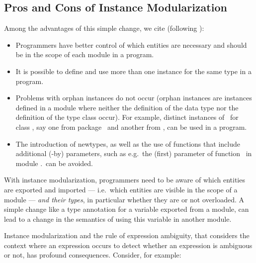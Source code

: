 \subsection{Pros and Cons of Instance Modularization}

Among the advantages of this simple change, we cite (following
\cite{Controlling-scope-instances}):

\begin{itemize}

  \item Programmers have better control of which entities are
    necessary and should be in the scope of each module in a program.

  \item It is possible to define and use more than one instance for
    the same type in a program.

  \item Problems with orphan instances do not occur (orphan instances
    are instances defined in a module where neither the definition of
    the data type nor the definition of the type class occur). For
    example, distinct instances of \Either\ for class \Monad, say one
    from package \mtl\ and another from \transformers, can be used in
    a program.

  \item The introduction of newtypes, as well as the use of functions
    that include additional (-by) parameters, such as e.g.~the (first)
    parameter of function \sortBy\ in module \Data.\List\ can be
    avoided.

\end{itemize}

With instance modularization, programmers need to be aware of which
entities are exported and imported --- i.e.~which entities are visible
in the scope of a module --- {\em and their types}, in particular
whether they are or not overloaded. A simple change like a type
annotation for a variable exported from a module, can lead to a change
in the semantics of using this variable in another module.


Instance modularization and the rule of expression ambiguity, that
considers the context where an expression occurs to detect whether an
expression is ambiguous or not, has profound consequences. Consider,
for example:


